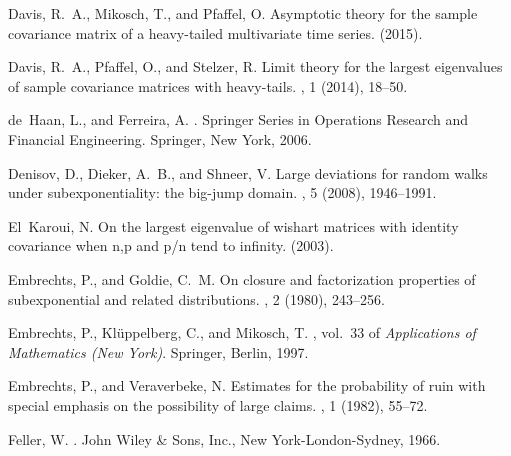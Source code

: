 \documentclass[11pt,reqno]{amsart}
\newcommand{\1}{\mathbf{1}}
\newcommand{\0}{\boldsymbol{0}}
\newcommand{\4}{\mathchoice{\mskip1.5mu}{\mskip1.5mu}{}{}}
\newcommand{\5}{\mathchoice{\mskip-1.5mu}{\mskip-1.5mu}{}{}}
\newcommand{\2}{\penalty250\mskip\thickmuskip\mskip-\thinmuskip} %
\begin{document}
\begin{thebibliography}{10}
{\sc Davis, R.~A., Mikosch, T., and Pfaffel, O.}
\newblock Asymptotic theory for the sample covariance matrix of a heavy-tailed
  multivariate time series.
 (2015).

{\sc Davis, R.~A., Pfaffel, O., and Stelzer, R.}
\newblock Limit theory for the largest eigenvalues of sample covariance
  matrices with heavy-tails.
, 1 (2014), 18--50.

{\sc de~Haan, L., and Ferreira, A.}
.
\newblock Springer Series in Operations Research and Financial Engineering.
  Springer, New York, 2006.

{\sc Denisov, D., Dieker, A.~B., and Shneer, V.}
\newblock Large deviations for random walks under subexponentiality: the
  big-jump domain.
, 5 (2008), 1946--1991.

{\sc El~Karoui, N.}
\newblock On the largest eigenvalue of wishart matrices with identity
  covariance when n,p and p/n tend to infinity.
 (2003).

{\sc Embrechts, P., and Goldie, C.~M.}
\newblock On closure and factorization properties of subexponential and related
  distributions.
, 2 (1980), 243--256.

{\sc Embrechts, P., Kl{\"u}ppelberg, C., and Mikosch, T.}
, vol.~33 of {\em Applications of
  Mathematics (New York)}.
\newblock Springer, Berlin, 1997.

{\sc Embrechts, P., and Veraverbeke, N.}
\newblock Estimates for the probability of ruin with special emphasis on the
  possibility of large claims.
, 1 (1982), 55--72.

{\sc Feller, W.}
.
\newblock John Wiley \& Sons, Inc., New York-London-Sydney, 1966.


\end{thebibliography}
\end{document}
